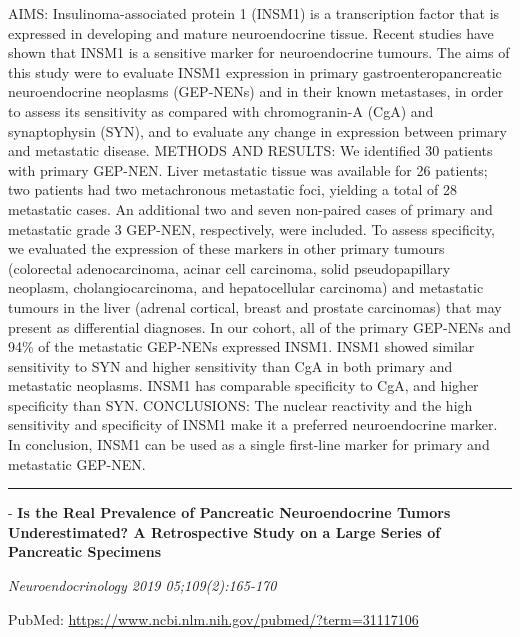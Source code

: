 \documentclass[]{article}
\begin{document}
AIMS: Insulinoma-associated protein 1 (INSM1) is a transcription factor
that is expressed in developing and mature neuroendocrine tissue. Recent
studies have shown that INSM1 is a sensitive marker for neuroendocrine
tumours. The aims of this study were to evaluate INSM1 expression in
primary gastroenteropancreatic neuroendocrine neoplasms (GEP-NENs) and
in their known metastases, in order to assess its sensitivity as
compared with chromogranin-A (CgA) and synaptophysin (SYN), and to
evaluate any change in expression between primary and metastatic
disease. METHODS AND RESULTS: We identified 30 patients with primary
GEP-NEN. Liver metastatic tissue was available for 26 patients; two
patients had two metachronous metastatic foci, yielding a total of 28
metastatic cases. An additional two and seven non-paired cases of
primary and metastatic grade 3 GEP-NEN, respectively, were included. To
assess specificity, we evaluated the expression of these markers in
other primary tumours (colorectal adenocarcinoma, acinar cell carcinoma,
solid pseudopapillary neoplasm, cholangiocarcinoma, and hepatocellular
carcinoma) and metastatic tumours in the liver (adrenal cortical, breast
and prostate carcinomas) that may present as differential diagnoses. In
our cohort, all of the primary GEP-NENs and 94\% of the metastatic
GEP-NENs expressed INSM1. INSM1 showed similar sensitivity to SYN and
higher sensitivity than CgA in both primary and metastatic neoplasms.
INSM1 has comparable specificity to CgA, and higher specificity than
SYN. CONCLUSIONS: The nuclear reactivity and the high sensitivity and
specificity of INSM1 make it a preferred neuroendocrine marker. In
conclusion, INSM1 can be used as a single first-line marker for primary
and metastatic GEP-NEN.

{}

{}

\begin{center}\rule{0.5\linewidth}{\linethickness}\end{center}

 - \textbf{Is the Real Prevalence of Pancreatic Neuroendocrine Tumors
Underestimated? A Retrospective Study on a Large Series of Pancreatic
Specimens}

\emph{Neuroendocrinology 2019 05;109(2):165-170}

PubMed: \url{https://www.ncbi.nlm.nih.gov/pubmed/?term=31117106}
\end{document}
